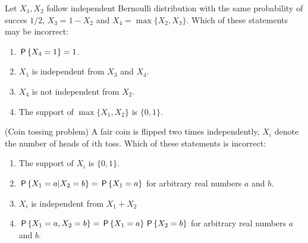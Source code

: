 \documentclass[poll_tutorial_format]{subfiles}
\begin{document}
	
	\begin{exercise}
		Let $X_1, X_2$ follow independent Bernoulli distribution with the same probability of succes $1/2$, $X_3=1-X_2$ and $X_4=\max\{X_2, X_3\}$. 
		Which of these statements may be incorrect: 
		\begin{enumerate}
			\item $\P{X_4=1}=1$.
			\item $X_1$ is independent from $X_3$ and $X_4$.
			\item $X_4$ is not independent from $X_2$.
			\item The support of $\max\{X_1,X_2\}$ is $\{0,1\}$.
		\end{enumerate}
	\end{exercise}
	
	
	\begin{exercise}
		(Coin tossing problem) A fair coin is flipped two times independently, $X_i$ denote the number of heads of $i$th toss. 
		Which of these statements is incorrect: 
		\begin{enumerate}
			\item The support of $X_i$ is $\{0,1\}$.
			\item $\P{X_1=a|X_2=b}=\P{X_1=a}$ for arbitrary real numbers $a$ and $b$.		
			\item $X_i$ is independent from $X_1+X_2$
			\item $\P{X_1=a, X_2=b}=\P{X_1=a}\P{X_2=b}$ for arbitrary real numbers $a$ and $b$.		
		\end{enumerate}
	\end{exercise}
	 
	
	
	
	
	
	
\end{document}
